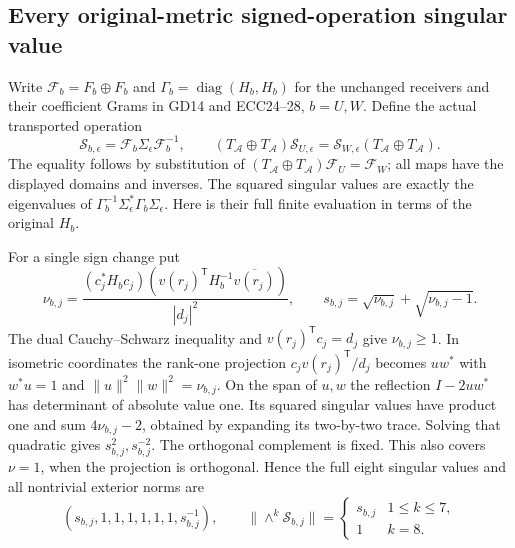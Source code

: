 \documentclass[11pt]{article}
\begin{document}
\subsection{Every original-metric signed-operation singular value}
Write $\mathcal F_b=F_b\oplus F_b$ and
$\Gamma_b=\operatorname{diag}(H_b,H_b)$ for the unchanged receivers
and their coefficient Grams in GD14 and ECC24--28, $b=U,W$.
Define the actual transported operation
\[
 \mathscr S_{b,\epsilon}=\mathcal F_b\Sigma_\epsilon\mathcal F_b^{-1},
 \qquad
 (T_{\mathcal A}\oplus T_{\mathcal A})\mathscr S_{U,\epsilon}
   =\mathscr S_{W,\epsilon}(T_{\mathcal A}\oplus T_{\mathcal A}).
 \tag{SGR8}
\]
The equality follows by substitution of
$(T_{\mathcal A}\oplus T_{\mathcal A})\mathcal F_U=\mathcal F_W$;
all maps have the displayed domains and inverses. The squared
singular values are exactly the eigenvalues of
$\Gamma_b^{-1}\Sigma_\epsilon^*\Gamma_b\Sigma_\epsilon$.
Here is their full finite evaluation in terms of the original $H_b$.

For a single sign change put
\[
 \nu_{b,j}=
 \frac{(c_j^*H_bc_j)
        (v(r_j)^{\mathsf T}H_b^{-1}\overline{v(r_j)})}{|d_j|^2},
 \qquad s_{b,j}=\sqrt{\nu_{b,j}}+\sqrt{\nu_{b,j}-1}.
 \tag{SGR9}
\]
The dual Cauchy--Schwarz inequality and $v(r_j)^{\mathsf T}c_j=d_j$
give $\nu_{b,j}\ge1$. In isometric coordinates the rank-one
projection $c_jv(r_j)^{\mathsf T}/d_j$ becomes $uw^*$ with
$w^*u=1$ and $\|u\|^2\|w\|^2=\nu_{b,j}$. On the span of $u,w$
the reflection $I-2uw^*$ has determinant of absolute value one.
Its squared singular values have product one and sum
$4\nu_{b,j}-2$, obtained by expanding its two-by-two trace.
Solving that quadratic gives $s_{b,j}^2,s_{b,j}^{-2}$.
The orthogonal complement is fixed. This also covers $\nu=1$,
when the projection is orthogonal. Hence the full eight singular
values and all nontrivial exterior norms are
\[
 (s_{b,j},1,1,1,1,1,1,s_{b,j}^{-1}),\qquad
 \|\wedge^k\mathscr S_{b,j}\|=
 \begin{cases}s_{b,j}&1\le k\le7,\\1&k=8.\end{cases}
 \tag{SGR10}
\]
\end{document}

